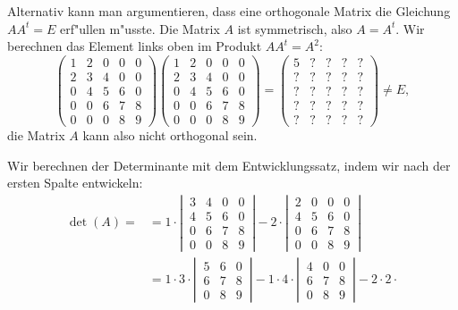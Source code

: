 \begin{loesung}
\begin{teilaufgaben}
Alternativ kann man argumentieren, dass eine orthogonale
Matrix die Gleichung $AA^t=E$ erf"ullen m"usste. Die Matrix $A$
ist symmetrisch, also $A=A^t$. Wir berechnen das Element links
oben im Produkt $AA^t=A^2$:
\[
\begin{pmatrix}
1&2&0&0&0\\
2&3&4&0&0\\
0&4&5&6&0\\
0&0&6&7&8\\
0&0&0&8&9
\end{pmatrix}
\begin{pmatrix}
1&2&0&0&0\\
2&3&4&0&0\\
0&4&5&6&0\\
0&0&6&7&8\\
0&0&0&8&9
\end{pmatrix}
=
\begin{pmatrix}
5&?&?&?&?\\
?&?&?&?&?\\
?&?&?&?&?\\
?&?&?&?&?\\
?&?&?&?&?
\end{pmatrix}
\ne E,
\]
die Matrix $A$ kann also nicht orthogonal sein.
\item
Wir berechnen der Determinante mit dem Entwicklungssatz, indem wir nach der
ersten Spalte entwickeln:
\begin{align*}
\det(A)=
&
=
1\cdot
\left|\,\begin{matrix}
3&4&0&0\\
4&5&6&0\\
0&6&7&8\\
0&0&8&9
\end{matrix}\,\right|
-2\cdot
\left|\,\begin{matrix}
2&0&0&0\\
4&5&6&0\\
0&6&7&8\\
0&0&8&9
\end{matrix}\,\right|
\\
&
=
1\cdot 3\cdot
\left|\,\begin{matrix}
5&6&0\\
6&7&8\\
0&8&9
\end{matrix}\,\right|
-1\cdot 4\cdot
\left|\,\begin{matrix}
4&0&0\\
6&7&8\\
0&8&9
\end{matrix}\,\right|
-2\cdot2\cdot

\end{align*}
\end{teilaufgaben}
\end{loesung}

